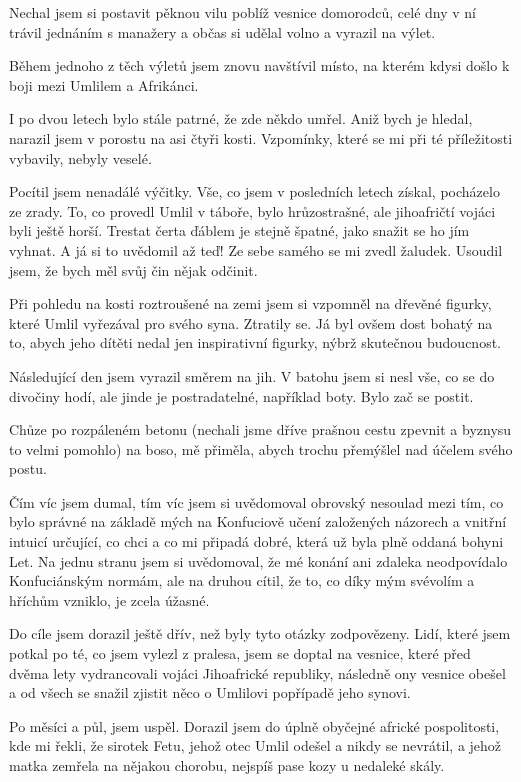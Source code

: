 Nechal jsem si postavit pěknou vilu poblíž vesnice domorodců, celé dny v ní trávil jednáním s manažery a občas si udělal volno a vyrazil na výlet.

Během jednoho z těch výletů jsem znovu navštívil místo, na kterém kdysi došlo k boji mezi Umlilem a Afrikánci.

I po dvou letech bylo stále patrné, že zde někdo umřel. Aniž bych je hledal, narazil jsem v porostu na asi čtyři kosti.  Vzpomínky, které se mi při té příležitosti vybavily, nebyly veselé. 

Pocítil jsem nenadálé výčitky. Vše, co jsem v posledních letech získal, pocházelo ze zrady.  To, co provedl Umlil v táboře, bylo hrůzostrašné, ale jihoafričtí vojáci byli ještě horší. Trestat čerta ďáblem je stejně špatné, jako snažit se ho jím vyhnat. A já si to uvědomil až teď! Ze sebe samého se mi zvedl žaludek. Usoudil jsem, že bych měl svůj čin nějak odčinit.

Při pohledu na kosti roztroušené na zemi jsem si vzpomněl na dřevěné figurky, které Umlil vyřezával pro svého syna. Ztratily se. Já byl ovšem dost bohatý na to, abych jeho dítěti nedal jen inspirativní figurky, nýbrž skutečnou budoucnost.
	
Následující den jsem vyrazil směrem na jih. V batohu jsem si nesl vše, co se do divočiny hodí, ale jinde je postradatelné, například boty. Bylo zač se postit.

Chůze po rozpáleném betonu (nechali jsme dříve prašnou cestu zpevnit a byznysu to velmi pomohlo) na boso, mě přiměla, abych trochu přemýšlel nad účelem svého postu.

Čím víc jsem dumal, tím víc jsem si uvědomoval obrovský nesoulad mezi tím, co bylo správné na základě mých na Konfuciově učení založených názorech a vnitřní intuicí určující, co chci a co mi připadá dobré, která už byla plně oddaná bohyni Let. Na jednu stranu jsem si uvědomoval, že mé konání ani zdaleka neodpovídalo Konfuciánským normám, ale na druhou cítil, že to, co díky mým svévolím a hříchům vzniklo, je zcela úžasné.

Do cíle jsem dorazil ještě dřív, než byly tyto otázky zodpovězeny. Lidí, které jsem potkal po té, co jsem vylezl z pralesa, jsem se doptal na vesnice, které před dvěma lety vydrancovali vojáci Jihoafrické republiky, následně ony vesnice obešel a od všech se snažil zjistit něco o Umlilovi popřípadě jeho synovi.

Po měsíci a půl, jsem uspěl. Dorazil jsem do úplně obyčejné africké pospolitosti, kde mi řekli, že sirotek Fetu, jehož otec Umlil odešel a nikdy se nevrátil, a jehož matka zemřela na nějakou chorobu, nejspíš pase kozy u nedaleké skály. 

